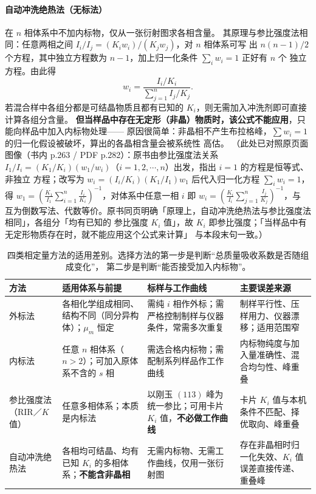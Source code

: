 \paragraph{自动冲洗绝热法（无标法）}在 $n$ 相体系中不加内标物，仅从一张衍射图求各相含量。
其原理与参比强度法相同：任意两相之间 $I_{i}/I_{j}=(K_{i}w_{i})/(K_{j}w_{j})$，对 $n$ 相体系可写
出 $n(n-1)/2$ 个方程，其中独立方程数为 $n-1$，加上归一化条件 $\sum_{i}w_{i}=1$ 正好有 $n$ 个
独立方程。由此得
\begin{equation}
w_{i}=\frac{I_{i}/K_{i}}{\sum_{j=1}^{n}I_{j}/K_{j}} .
\label{eq:ch04b-flushing}
\end{equation}
若混合样中各组分都是可结晶物质且都有已知的 $K_{i}$，则无需加入冲洗剂即可直接计算各组分含量。
\textbf{但当样品中存在无定形（非晶）物质时，该公式不能应用}，只能向样品中加入内标物处理——
原因很简单：非晶相不产生布拉格峰，$\sum w_{i}=1$ 的归一化假设被破坏，算出的各晶相含量会被系统性
高估。
（此处已对照原页面图像（书内 p.263 / PDF p.282）：原书由参比强度法关系
$I_{1}/I_{i}=(K_{1}/K_{i})(w_{1}/w_{i})$（$i=1,2,\cdots,n$）出发，指出 $i=1$ 的方程是恒等式、非独立
方程；改写为 $w_{i}=(I_{i}/K_{i})(K_{1}/I_{1})w_{1}$ 后代入归一化方程 $\sum_{i}w_{i}=1$，得
$w_{1}=\left(\frac{K_{1}}{I_{1}}\sum_{i=1}^{n}\frac{I_{i}}{K_{i}}\right)^{-1}$，对体系中任意一相 $i$ 即
$w_{i}=\left(\frac{K_{i}}{I_{i}}\sum_{j=1}^{n}\frac{I_{j}}{K_{j}}\right)^{-1}$，与
互为倒数写法、代数等价。原书同页明确「原理上，自动冲洗绝热法与参比强度法相同」，各组分「均有已知的
参比强度 $K_{i}$ 值」，故 $K_{i}$ 即参比强度；「当样品中有无定形物质存在时，就不能应用这个公式来计算」
与本段末句一致。）

\begin{table}[tbp]
  \centering
  \caption{四类相定量方法的适用差别。选择方法的第一步是判断“总质量吸收系数是否随组成变化”，
    第二步是判断“能否接受加入内标物”。}
  \label{tab:ch04b-quantmethods}
  \begin{tabular}{@{}p{21mm}p{42mm}p{33mm}p{38mm}@{}}
    \toprule
    方法 & 适用体系与前提 & 标样与工作曲线 & 主要误差来源 \\
    \midrule
    外标法 & 各相化学组成相同、结构不同（同分异构体）；$\mu_{m}$ 恒定 &
    需纯 $i$ 相作外标；需严格控制制样与仪器条件，常需多次重复 &
    制样平行性、压样用力、仪器漂移；适用范围窄 \\
    内标法 & 任意 $n$ 相体系（$n>2$）；可加入原体系不含的 $s$ 相 &
    需选合格内标物；需配制系列样品作工作曲线 &
    内标物纯度与加入量准确性、混合均匀性、峰重叠 \\
    参比强度法（RIR／$K$ 值） & 任意多相体系；本质是内标法 &
    以刚玉 $(113)$ 峰为统一参比；可用卡片 $K_{i}$ 值，\textbf{不必做工作曲线} &
    卡片 $K_{i}$ 值与本机条件不匹配、择优取向、峰重叠 \\
    自动冲洗绝热法 & 各相均可结晶、均有已知 $K_{i}$ 的多相体系；\textbf{不能含非晶相} &
    无需内标物、无需工作曲线，仅用一张衍射图 &
    存在非晶相时归一化失效、$K_{i}$ 值误差直接传递、重叠峰 \\
    \bottomrule
  \end{tabular}
\end{table}

